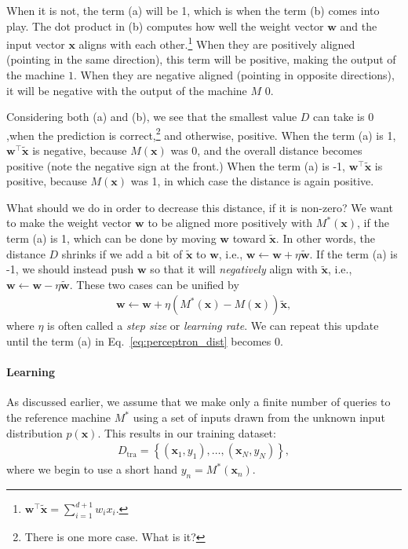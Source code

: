 \documentclass{report}
\newcommand{\vect}[1]{\mathbf{#1}}
\newcommand{\vx}[0]{\vect{x}}
\newcommand{\vw}[0]{\vect{w}}
\begin{document}
When it is not, the term (a) will be 1, which is when the term (b) comes into
play. The dot product in (b) computes how well the weight vector $\vw$ and the
input vector $\vx$ aligns with each other.\footnote{
    $\vw^\top \tilde{\vx} = \sum_{i=1}^{d+1} w_i x_i$.
} When they are positively aligned (pointing in the same direction), this term
will be positive, making the output of the machine $1$. When they are negative
aligned (pointing in opposite directions), it will be negative with the output
of the machine $M$ $0$.

Considering both (a) and (b), we see that the smallest value $D$ can take is $0$
,when the prediction is correct,\footnote{
    There is one more case. What is it?
} and otherwise, positive. When the term (a) is 1, $\vw^\top \tilde{\vx}$ is
negative, because $M(\vx)$ was 0, and the overall distance becomes positive
(note the negative sign at the front.) When the term (a) is -1, $\vw^\top
\tilde{\vx}$ is positive, because $M(\vx)$ was 1, in which case the distance is
again positive. 

What should we do in order to decrease this distance, if it is non-zero? We want
to make the weight vector $\vw$ to be aligned more positively with $M^*(\vx)$,
if the term (a) is 1, which can be done by moving $\vw$ toward $\tilde{\vx}$. In
other words, the distance $D$ shrinks if we add a bit of $\tilde{\vx}$ to $\vw$,
i.e., $\vw \leftarrow \vw + \eta \tilde{\vw}$. If the term (a) is -1, we should
instead push $\vw$ so that it will {\it negatively} align with $\tilde{\vx}$,
i.e., $\vw \leftarrow \vw - \eta \tilde{\vw}$. These two cases can be unified by
\begin{align}
    \label{eq:perceptron_rule0}
    \vw \leftarrow \vw + \eta \left( M^*(\vx) - M(\vx)\right) \tilde{\vx},
\end{align}
where $\eta$ is often called a {\it step size} or {\it learning rate}.  We can
repeat this update until the term (a) in Eq.~\eqref{eq:perceptron_dist} becomes
0. 

\paragraph{Learning}

As discussed earlier, we assume that we make only a finite number of queries to
the reference machine $M^*$ using a set of inputs drawn from the unknown input
distribution $p(\vx)$. This results in our training dataset:
\begin{align*}
    D_{\text{tra}} = \left\{ (\vx_1, y_1), \ldots, (\vx_N, y_N) \right\},
\end{align*}
where we begin to use a short hand $y_n=M^*(\vx_n)$.
\end{document}
